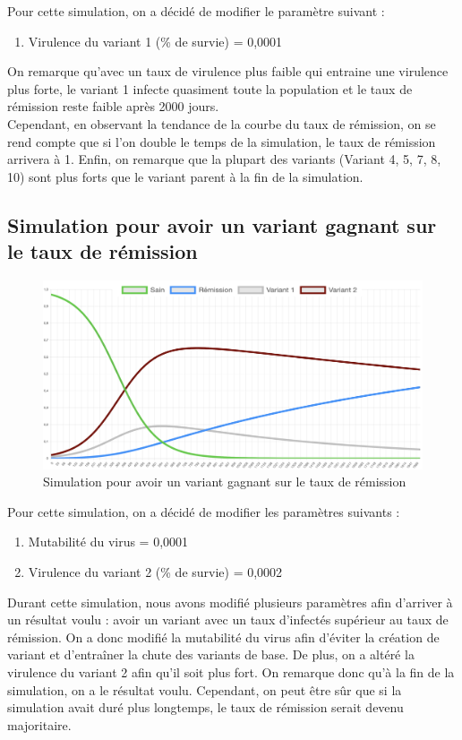 \documentclass{article}
\begin{document}
Pour cette simulation, on a décidé de modifier le paramètre suivant :
\begin{enumerate}
    \item Virulence du variant 1 (\% de survie) = 0,0001 \\
\end{enumerate}

\noindent
On remarque qu'avec un taux de virulence plus faible qui entraine une virulence plus forte, le variant 1 infecte quasiment toute la population et le taux de rémission reste faible après 2000 jours. \\ Cependant, en observant la tendance de la courbe du taux de rémission, on se rend compte que si l'on double le temps de la simulation, le taux de rémission arrivera à 1.
Enfin, on remarque que la plupart des variants (Variant 4, 5, 7, 8, 10) sont plus forts que le variant parent à la fin de la simulation. \\

\subsection{Simulation pour avoir un variant gagnant sur le taux de rémission}

\begin{figure}[h]
    \includegraphics[width=\linewidth]{images/Simulation5.png}
    \caption{Simulation pour avoir un variant gagnant sur le taux de rémission}
    \label{fig:simulation5}
\end{figure}

Pour cette simulation, on a décidé de modifier les paramètres suivants :
\begin{enumerate}
    \item Mutabilité du virus = 0,0001
    \item Virulence du variant 2 (\% de survie) = 0,0002
\end{enumerate}
\noindent
Durant cette simulation, nous avons modifié plusieurs paramètres afin d'arriver à un résultat voulu : avoir un variant avec un taux d'infectés supérieur au taux de rémission. On a donc modifié la mutabilité du virus afin d'éviter la création de variant et d'entraîner la chute des variants de base. De plus, on a altéré la virulence du variant 2 afin qu'il soit plus fort. On remarque donc qu'à la fin de la simulation, on a le résultat voulu. Cependant, on peut être sûr que si la simulation avait duré plus longtemps, le taux de rémission serait devenu majoritaire.
\end{document}
